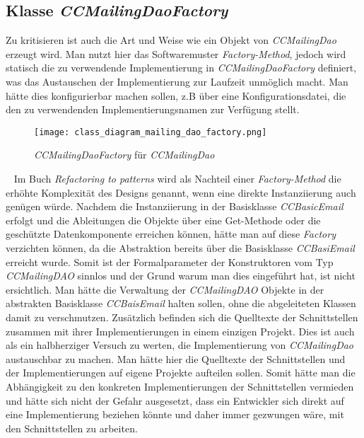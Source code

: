\subsection{Klasse \emph{CCMailingDaoFactory}}
Zu kritisieren ist auch die Art und Weise wie ein Objekt von \emph{CCMailingDao} erzeugt wird. Man nutzt hier das Softwaremuster \emph{Factory-Method}, jedoch wird statisch die zu verwendende Implementierung in \emph{CCMailingDaoFactory} definiert, was das Austauschen der Implementierung zur Laufzeit unmöglich macht. Man hätte dies konfigurierbar machen sollen, z.B über eine Konfigurationsdatei, die den zu verwendenden Implementierungsnamen zur Verfügung stellt.
\begin{figure}[h]
\centering
\texttt{[image: class\_diagram\_mailing\_dao\_factory.png]} 
\caption{\emph{CCMailingDaoFactory} für \emph{CCMailingDao}}
\label{fig:klassen-hierarchie-ccmailingfactory}
\end{figure}
\ \newline 
Im Buch \emph{Refactoring to patterns} \cite[72]{refactoreToPatterns} wird als Nachteil einer \emph{Factory-Method} die erhöhte Komplexität des Designs genannt, wenn eine direkte Instanziierung auch genügen würde. Nachdem die Instanziierung in der Basisklasse \emph{CCBasicEmail} erfolgt und die Ableitungen die Objekte über eine Get-Methode oder die geschützte Datenkomponente erreichen können, hätte man auf diese \emph{Factory} verzichten können, da die Abstraktion bereits über die Basisklasse \emph{CCBasiEmail} erreicht wurde. Somit ist der Formalparameter der Konstruktoren vom Typ \emph{CCMailingDAO} sinnlos und der Grund warum man dies eingeführt hat, ist nicht ersichtlich. Man hätte die Verwaltung der \emph{CCMailingDAO} Objekte in der abstrakten Basisklasse \emph{CCBaisEmail} halten sollen, ohne die abgeleiteten Klassen damit zu verschmutzen. 
\newline 
\newline
Zusätzlich befinden sich die Quelltexte der Schnittstellen zusammen mit ihrer Implementierungen in einem einzigen Projekt. Dies ist auch als ein halbherziger Versuch zu werten, die Implementierung von \emph{CCMailingDao} austauschbar zu machen. Man hätte hier die Quelltexte der Schnittstellen und der Implementierungen auf eigene Projekte aufteilen sollen. Somit hätte man die Abhängigkeit zu den konkreten Implementierungen der Schnittstellen vermieden und hätte sich nicht der Gefahr ausgesetzt, dass ein Entwickler sich direkt auf eine Implementierung beziehen könnte und daher immer gezwungen wäre, mit den Schnittstellen zu arbeiten.

